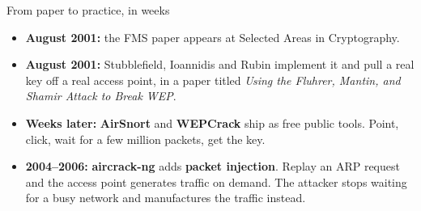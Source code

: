 \ifdefined\PRESENTATION\else\PassOptionsToClass{handout}{beamer}\fi\documentclass[aspectratio=169, lualatex]{beamer}
\begin{document}
\begin{frame}{From paper to practice, in weeks}
	\begin{itemize}[<+->]
		\item \textbf{August 2001:} the FMS paper appears at Selected Areas in Cryptography.
		\item \textbf{August 2001:} Stubblefield, Ioannidis and Rubin implement it and pull a real key off a real access point, in a paper titled \textit{Using the Fluhrer, Mantin, and Shamir Attack to Break WEP}.
		\item \textbf{Weeks later:} \textbf{AirSnort} and \textbf{WEPCrack} ship as free public tools. Point, click, wait for a few million packets, get the key.
		\item \textbf{2004--2006:} \textbf{aircrack-ng} adds \textbf{packet injection}. Replay an ARP request and the access point generates traffic on demand. The attacker stops waiting for a busy network and manufactures the traffic instead.
	\end{itemize}
\end{frame}
\end{document}
